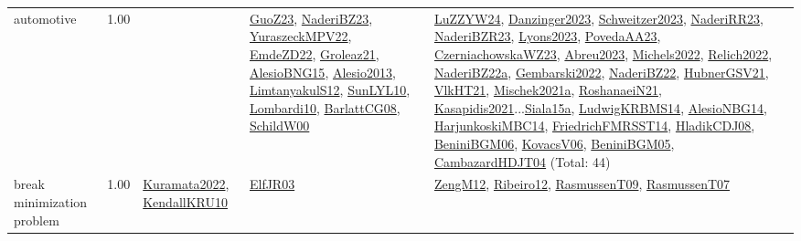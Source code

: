 {\begin{longtable}{p{3cm}r>{\raggedright\arraybackslash}p{6cm}>{\raggedright\arraybackslash}p{6cm}>{\raggedright\arraybackslash}p{8cm}}
\index{automotive}\index{ApplicationAreas!automotive}automotive &  1.00 &  & \hyperref[detail:GuoZ23]{GuoZ23}, \hyperref[detail:NaderiBZ23]{NaderiBZ23}, \hyperref[detail:YuraszeckMPV22]{YuraszeckMPV22}, \hyperref[detail:EmdeZD22]{EmdeZD22}, \hyperref[detail:Groleaz21]{Groleaz21}, \hyperref[detail:AlesioBNG15]{AlesioBNG15}, \hyperref[detail:Alesio2013]{Alesio2013}, \hyperref[detail:LimtanyakulS12]{LimtanyakulS12}, \hyperref[detail:SunLYL10]{SunLYL10}, \hyperref[detail:Lombardi10]{Lombardi10}, \hyperref[detail:BarlattCG08]{BarlattCG08}, \hyperref[detail:SchildW00]{SchildW00} & \hyperref[detail:LuZZYW24]{LuZZYW24}, \hyperref[detail:Danzinger2023]{Danzinger2023}, \hyperref[detail:Schweitzer2023]{Schweitzer2023}, \hyperref[detail:NaderiRR23]{NaderiRR23}, \hyperref[detail:NaderiBZR23]{NaderiBZR23}, \hyperref[detail:Lyons2023]{Lyons2023}, \hyperref[detail:PovedaAA23]{PovedaAA23}, \hyperref[detail:CzerniachowskaWZ23]{CzerniachowskaWZ23}, \hyperref[detail:Abreu2023]{Abreu2023}, \hyperref[detail:Michels2022]{Michels2022}, \hyperref[detail:Relich2022]{Relich2022}, \hyperref[detail:NaderiBZ22a]{NaderiBZ22a}, \hyperref[detail:Gembarski2022]{Gembarski2022}, \hyperref[detail:NaderiBZ22]{NaderiBZ22}, \hyperref[detail:HubnerGSV21]{HubnerGSV21}, \hyperref[detail:VlkHT21]{VlkHT21}, \hyperref[detail:Mischek2021a]{Mischek2021a}, \hyperref[detail:RoshanaeiN21]{RoshanaeiN21}, \hyperref[detail:Kasapidis2021]{Kasapidis2021}...\hyperref[detail:Siala15a]{Siala15a}, \hyperref[detail:LudwigKRBMS14]{LudwigKRBMS14}, \hyperref[detail:AlesioNBG14]{AlesioNBG14}, \hyperref[detail:HarjunkoskiMBC14]{HarjunkoskiMBC14}, \hyperref[detail:FriedrichFMRSST14]{FriedrichFMRSST14}, \hyperref[detail:HladikCDJ08]{HladikCDJ08}, \hyperref[detail:BeniniBGM06]{BeniniBGM06}, \hyperref[detail:KovacsV06]{KovacsV06}, \hyperref[detail:BeniniBGM05]{BeniniBGM05}, \hyperref[detail:CambazardHDJT04]{CambazardHDJT04} (Total: 44)\\
\index{break minimization problem}\index{ApplicationAreas!break minimization problem}break minimization problem &  1.00 & \hyperref[detail:Kuramata2022]{Kuramata2022}, \hyperref[detail:KendallKRU10]{KendallKRU10} & \hyperref[detail:ElfJR03]{ElfJR03} & \hyperref[detail:ZengM12]{ZengM12}, \hyperref[detail:Ribeiro12]{Ribeiro12}, \hyperref[detail:RasmussenT09]{RasmussenT09}, \hyperref[detail:RasmussenT07]{RasmussenT07}\\

\end{longtable}}
